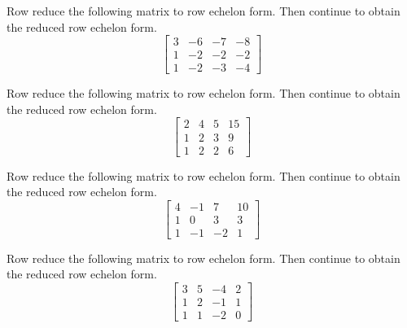 \documentclass{ximera}
\begin{document}
\begin{problem}\label{prb:2.20} Row reduce the following matrix to row echelon form. Then continue to obtain the reduced row echelon form.
\begin{equation*}
\left[
\begin{array}{rrrr}
3 & -6 & -7 & -8 \\
1 & -2 & -2 & -2 \\
1 & -2 & -3 & -4
\end{array}
\right]
\end{equation*}
\end{problem}

\begin{problem}\label{prb:2.21} Row reduce the following matrix to row echelon form. Then continue to obtain the reduced row echelon form.
\begin{equation*}
\left[
\begin{array}{rrrr}
2 & 4 & 5 & 15 \\
1 & 2 & 3 & 9 \\
1 & 2 & 2 & 6
\end{array}
\right]
\end{equation*}
\end{problem}

\begin{problem}\label{prb:2.22} Row reduce the following matrix to row echelon form. Then continue to obtain the reduced row echelon form.
\begin{equation*}
\left[
\begin{array}{rrrr}
4 & -1 & 7 & 10 \\
1 & 0 & 3 & 3 \\
1 & -1 & -2 & 1
\end{array}
\right]
\end{equation*}
\end{problem}

\begin{problem}\label{prb:2.23} Row reduce the following matrix to row echelon form. Then continue to obtain the reduced row echelon form.
\begin{equation*}
\left[
\begin{array}{rrrr}
3 & 5 & -4 & 2 \\
1 & 2 & -1 & 1 \\
1 & 1 & -2 & 0
\end{array}
\right]
\end{equation*}
\end{problem}
\end{document}
